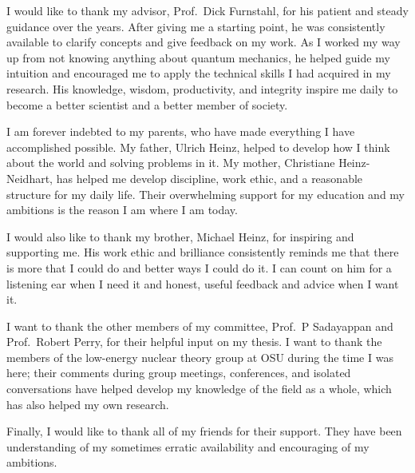 \begin{acknowledgments}
I would like to thank my advisor, Prof.~Dick Furnstahl, for his patient and steady guidance over the years. After giving me a starting point, he was consistently available to clarify concepts and give feedback on my work. As I worked my way up from not knowing anything about quantum mechanics, he helped guide my intuition and encouraged me to apply the technical skills I had acquired in my research. His knowledge, wisdom, productivity, and integrity inspire me daily to become a better scientist and a better member of society.

I am forever indebted to my parents, who have made everything I have accomplished possible. My father, Ulrich Heinz, helped to develop how I think about the world and solving problems in it. My mother, Christiane Heinz-Neidhart, has helped me develop discipline, work ethic, and a reasonable structure for my daily life. Their overwhelming support for my education and my ambitions is the reason I am where I am today.

I would also like to thank my brother, Michael Heinz, for inspiring and supporting me. His work ethic and brilliance consistently reminds me that there is more that I could do and better ways I could do it. I can count on him for a listening ear when I need it and honest, useful feedback and advice when I want it.

I want to thank the other members of my committee, Prof.~P Sadayappan and Prof.~Robert Perry, for their helpful input on my thesis. I want to thank the members of the low-energy nuclear theory group at OSU during the time I was here; their comments during group meetings, conferences, and isolated conversations have helped develop my knowledge of the field as a whole, which has also helped my own research.

Finally, I would like to thank all of my friends for their support. They have been understanding of my sometimes erratic availability and encouraging of my ambitions.
\end{acknowledgments}
